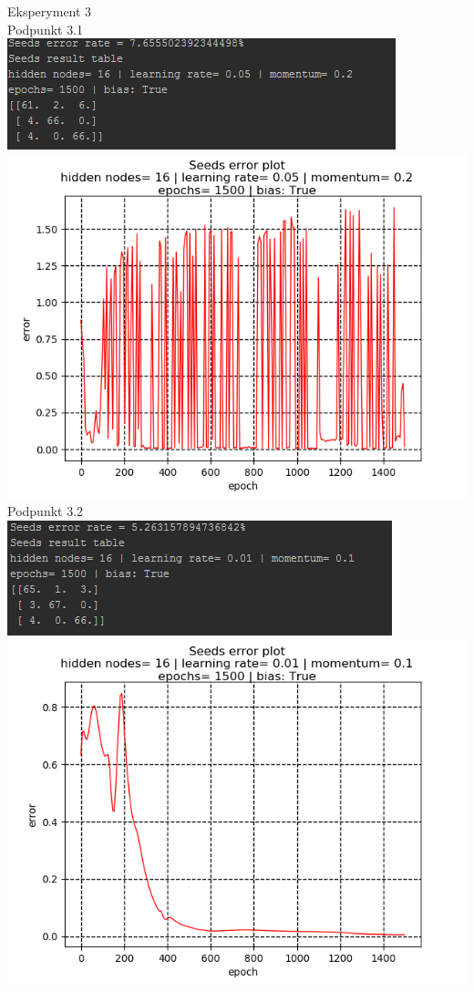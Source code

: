 \documentclass{classrep}
\begin{document}
{Eksperyment 3\\
Podpunkt 3.1\\
\includegraphics{imgs/311.png}\\
\includegraphics{imgs/312.png}\\
Podpunkt 3.2\\
\includegraphics{imgs/321.png}\\
\includegraphics{imgs/322.png}\\
}
\end{document}
